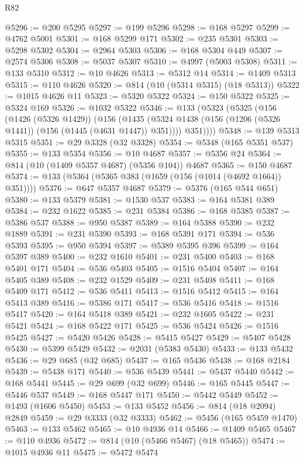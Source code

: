 \begin{lexlean}{R82}
\begin{coremodule}
@5296 := @200 @5295
@5297 := @199 @5296
@5298 := @168 @5297
@5299 := @4762 @5001
@5301 := @168 @5299 @171
@5302 := @235 @5301
@5303 := @5298 @5302
@5304 := @2964 @5303
@5306 := @168 @5304 @449
@5307 := @2574 @5306
@5308 := @5037 @5307
@5310 := @4997 (@5003 @5308)
@5311 := @133 @5310
@5312 := @10 @4626
@5313 := @5312 @14
@5314 := @1409 @5313
@5315 := @110 @4626
@5320 := @814 (@10 (@5314 @5315) (@18 @5313))
@5322 := @1015 @4626 @11
@5323 := @5320 @5322
@5324 := @150 @5322
@5325 := @5324 @169
@5326 := @1032 @5322
@5346 := @133
    (@5323
      (@5325
        (@156
          (@1426 (@5326 @1429))
          (@156
            (@1435 (@5324 @1438 (@156 (@1206 (@5326 @1441)) (@156 (@1445 (@4631 @1447)) @351))))
            @351))))
@5348 := @139 @5313 @5315
@5351 := @29 @3328 (@32 @3328)
@5354 := @5348 (@165 @5351 @537)
@5355 := @133 @5354
@5356 := @10 @4687
@5357 := @5356 @24
@5364 := @814 (@10 (@1409 @5357 @4687) (@5356 @104)) @4687
@5365 := @150 @4687
@5374 := @133 (@5364 (@5365 @383 (@1659 (@156 (@1014 (@4692 @1664)) @351))))
@5376 := @647 @5357 @4687
@5379 := @5376 (@165 @544 @651)
@5380 := @133 @5379
@5381 := @1530 @537
@5383 := @164 @5381 @389
@5384 := @232 @1622
@5385 := @231 @5384
@5386 := @168 @5385
@5387 := @5386 @537
@5388 := @950 @5387
@5389 := @164 @5388
@5390 := @232 @1889
@5391 := @231 @5390
@5393 := @168 @5391 @171
@5394 := @536 @5393
@5395 := @950 @5394
@5397 := @5389 @5395 @396
@5399 := @164 @5397 @389
@5400 := @232 @1610
@5401 := @231 @5400
@5403 := @168 @5401 @171
@5404 := @536 @5403
@5405 := @1516 @5404
@5407 := @164 @5405 @389
@5408 := @232 @1529
@5409 := @231 @5408
@5411 := @168 @5409 @171
@5412 := @536 @5411
@5413 := @1516 @5412
@5415 := @164 @5413 @389
@5416 := @5386 @171
@5417 := @536 @5416
@5418 := @1516 @5417
@5420 := @164 @5418 @389
@5421 := @232 @1605
@5422 := @231 @5421
@5424 := @168 @5422 @171
@5425 := @536 @5424
@5426 := @1516 @5425
@5427 := @5420 @5426
@5428 := @5415 @5427
@5429 := @5407 @5428
@5430 := @5399 @5429
@5432 := @2031 (@5383 @5430)
@5433 := @133 @5432
@5436 := @29 @685 (@32 @685)
@5437 := @165 @5436
@5438 := @168 @2184
@5439 := @5438 @171
@5440 := @536 @5439
@5441 := @5437 @5440
@5442 := @168 @5441
@5445 := @29 @699 (@32 @699)
@5446 := @165 @5445
@5447 := @5446 @537
@5449 := @168 @5447 @171
@5450 := @5442 @5449
@5452 := @1493 (@1606 @5450)
@5453 := @133 @5452
@5456 := @814 (@18 @2094) @2849
@5459 := @29 @3333 (@32 @3333)
@5462 := @5456 (@165 @5459 @1470)
@5463 := @133 @5462
@5465 := @10 @4936 @14
@5466 := @1409 @5465
@5467 := @110 @4936
@5472 := @814 (@10 (@5466 @5467) (@18 @5465))
@5474 := @1015 @4936 @11
@5475 := @5472 @5474

\end{coremodule}
\end{lexlean}
